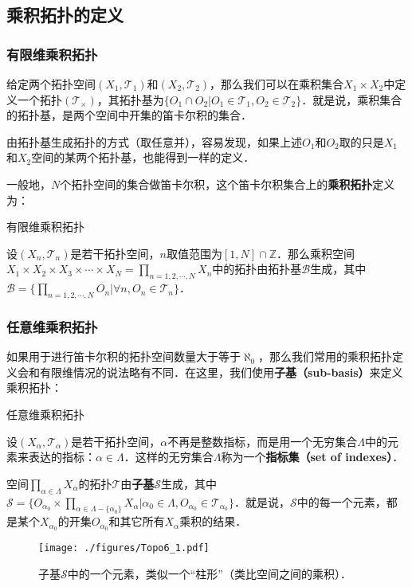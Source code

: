 
\subsection{乘积拓扑的定义}
\subsubsection{有限维乘积拓扑}

给定两个拓扑空间$(X_1, \mathcal{T}_1)$和$(X_2, \mathcal{T}_2)$，那么我们可以在乘积集合$X_1\times X_2$中定义一个拓扑$(\mathcal{T_\times})$，其拓扑基为$\{O_1\cap O_2|O_1\in\mathcal{T_1}, O_2\in\mathcal{T_2}\}$．就是说，乘积集合的拓扑基，是两个空间中开集的笛卡尔积的集合．

由拓扑基生成拓扑的方式（取任意并），容易发现，如果上述$O_1$和$O_2$取的只是$X_1$和$X_2$空间的某两个拓扑基，也能得到一样的定义．

一般地，$N$个拓扑空间的集合做笛卡尔积，这个笛卡尔积集合上的\textbf{乘积拓扑}定义为：

\begin{definition}{有限维乘积拓扑}

设$(X_n, \mathcal{T}_n)$是若干拓扑空间，$n$取值范围为$[1, N]\cap\mathbb{Z}$．那么乘积空间$X_1\times X_2\times X_3\times\cdots\times X_N=\prod\limits_{n=1,2,\cdots,N}X_n$中的拓扑由拓扑基$\mathcal{B}$生成，其中$\mathcal{B}=\{\prod\limits_{n=1,2,\cdots,N}O_n|\forall n, O_n\in\mathcal{T}_n\}$．

\end{definition}

\subsubsection{任意维乘积拓扑}

如果用于进行笛卡尔积的拓扑空间数量大于等于$\aleph_0$，那么我们常用的乘积拓扑定义会和有限维情况的说法略有不同．在这里，我们使用\textbf{子基（sub-basis）}来定义乘积拓扑：

\begin{definition}{任意维乘积拓扑}

设$(X_\alpha, \mathcal{T}_\alpha)$是若干拓扑空间，$\alpha$不再是整数指标，而是用一个无穷集合$\Lambda$中的元素来表达的指标：$\alpha\in\Lambda$．这样的无穷集合$\Lambda$称为一个\textbf{指标集（set of indexes）}．

空间$\prod\limits_{\alpha\in\Lambda}X_\alpha$的拓扑$\mathcal{T}$由\textbf{子基}$\mathcal{S}$生成，其中$\mathcal{S}=\{O_{\alpha_0}\times\prod\limits_{\alpha\in\Lambda-\{\alpha_0\}}X_\alpha|\alpha_0\in\Lambda, O_{\alpha_0}\in\mathcal{T}_{\alpha_0}\}$．就是说，$\mathcal{S}$中的每一个元素，都是某个$X_{\alpha_0}$的开集$O_{\alpha_0}$和其它所有$X_\alpha$乘积的结果．

\begin{figure}[ht]
\centering
\texttt{[image: ./figures/Topo6\_1.pdf]}
\caption{子基$\mathcal{S}$中的一个元素，类似一个“柱形”（类比空间之间的乘积）．} \label{Topo6_fig1}
\end{figure}

\end{definition}

